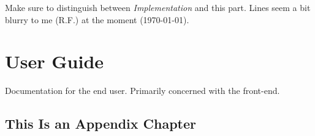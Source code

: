 \documentclass[a4paper,oneside]{alpenthesis/alpenthesis}
\begin{document}
Make sure  to distinguish  between \emph{Implementation} and  this part. Lines
seem a bit blurry to me (R.F.) at the moment (\today).

\part{User Guide} 
\label{part:User_Guide}
Documentation  for the  end user. Primarily  concerned with  the 
front-end.


\cleardoublepage %
\begin{titlingpage*}
    \begin{vplace}
        \flushright\Huge\bfseries\sffamily\appendixpagename
    \end{vplace}
\end{titlingpage*}
\appendix
{}


\chapter{This Is an Appendix Chapter}
\label{ch:appendix-chapter}


\cleardoublepage %
\backmatter


\printindex
\end{document}
